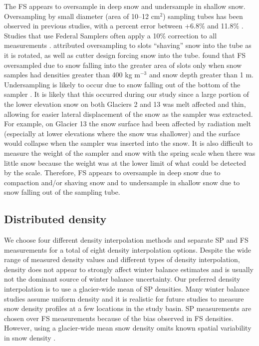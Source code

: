 \documentclass[review,oneside, letterpaper]{igs}
\begin{document}
The FS appears to oversample in deep snow and undersample in shallow snow. Oversampling by small diameter (area of 10--12 cm$^2$) sampling tubes has been observed in previous studies, with a percent error between +6.8\% and 11.8\% \citep{Work1965, Fames1982, Conger2009}. Studies that use Federal Samplers often apply a 10\% correction to all measurements \citep[e.g.][]{Molotch2005}. \cite{Dixon2012} attributed oversampling to slots ``shaving'' snow into the tube as it is rotated, as well as cutter design forcing snow into the tube. \cite{Beaumont1963} found that FS oversampled due to snow falling into the greater area of slots only when snow samples had densities greater than 400 kg m$^{-3}$ and snow depth greater than 1 m. Undersampling is likely to occur due to snow falling out of the bottom of the sampler \citep{Turcan1975}. It is likely that this occurred during our study since a large portion of the lower elevation snow on both Glaciers 2 and 13 was melt affected and thin, allowing for easier lateral displacement of the snow as the sampler was extracted. For example, on Glacier 13 the snow surface had been affected by radiation melt (especially at lower elevations where the snow was shallower) and the surface would collapse when the sampler was inserted into the snow. It is also difficult to measure the weight of the sampler and snow with the spring scale when there was little snow because the weight was at the lower limit of what could be detected by the scale. Therefore, FS appears to oversample in deep snow due to compaction and/or shaving snow and to undersample in shallow snow due to snow falling out of the sampling tube. 

\subsection{Distributed density}

We choose four different density interpolation methods and separate SP and FS measurements for a total of eight density interpolation options. Despite the wide range of measured density values and different types of density interpolation, density does not appear to strongly affect winter balance estimates and is usually not the dominant source of winter balance uncertainty. Our preferred density interpolation is to use a glacier-wide mean of SP densities. Many winter balance studies assume uniform density \citep[e.g.][]{Elder1991,McGrath2015,Cullen2017} and it is realistic for future studies to measure snow density profiles at a few locations in the study basin. SP measurements are chosen over FS measurements because of the bias observed in FS densities. However, using a glacier-wide mean snow density omits known spatial variability in snow density \citep{Wetlaufer2016}. 
\end{document}
